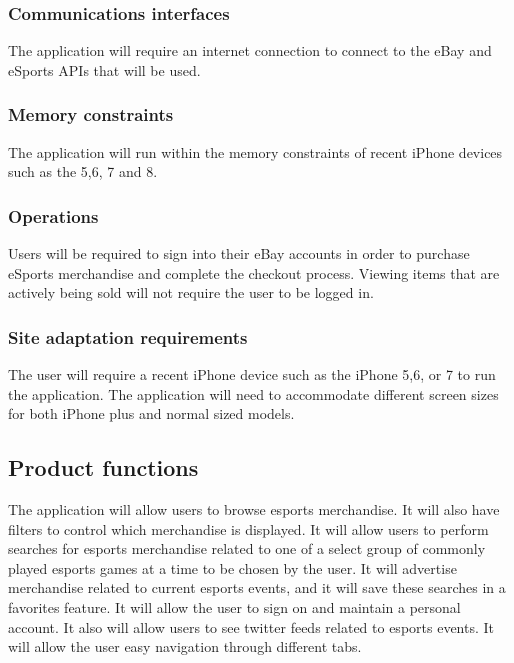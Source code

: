 \documentclass[onecolumn, draftclsnofoot,10pt, compsoc]{IEEEtran}
\begin{document}
\subsubsection{Communications interfaces}
The application will require an internet connection to connect to the eBay and eSports APIs that will be used.

\subsubsection{Memory constraints}
The application will run within the memory constraints of recent iPhone devices such as the 5,6, 7 and 8.

\subsubsection{Operations}
Users will be required to sign into their eBay accounts in order to purchase eSports merchandise and complete the checkout process. 
Viewing items that are actively being sold will not require the user to be logged in. 

\subsubsection{Site adaptation requirements}
The user will require a recent iPhone device such as the iPhone 5,6, or 7 to run the application. The application will need to accommodate different screen sizes for both iPhone plus and normal sized models. 

\subsection{Product functions}
The application will allow users to browse esports merchandise. It will also have filters to control which merchandise is displayed.  It will allow users to perform searches for esports merchandise related to one of a select group of commonly played esports games at a time to be chosen by the user. It will advertise merchandise related to current esports events, and it will save these searches in a favorites feature. It will allow the user to sign on and maintain a personal account. It also will allow users to see twitter feeds related to esports events.  It will allow the user easy navigation through different tabs. 
\end{document}
